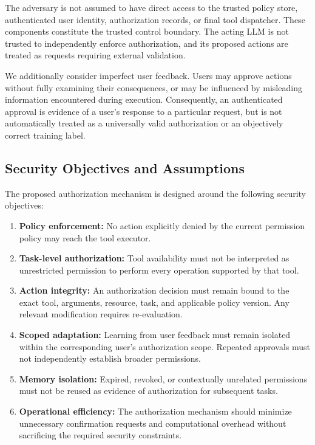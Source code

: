 \documentclass[10pt,conference]{IEEEtran}
\begin{document}
The adversary is not assumed to have direct access to the trusted policy store, authenticated user identity, authorization records, or final tool dispatcher. These components constitute the trusted control boundary. The acting LLM is not trusted to independently enforce authorization, and its proposed actions are treated as requests requiring external validation.

We additionally consider imperfect user feedback. Users may approve actions without fully examining their consequences, or may be influenced by misleading information encountered during execution. Consequently, an authenticated approval is evidence of a user's response to a particular request, but is not automatically treated as a universally valid authorization or an objectively correct training label.

\subsection{Security Objectives and Assumptions}

The proposed authorization mechanism is designed around the following security objectives:

\begin{enumerate}

    \item \textbf{Policy enforcement:}
    No action explicitly denied by the current permission policy may reach the tool executor.

    \item \textbf{Task-level authorization:}
    Tool availability must not be interpreted as unrestricted permission to perform every operation supported by that tool.

    \item \textbf{Action integrity:}
    An authorization decision must remain bound to the exact tool, arguments, resource, task, and applicable policy version. Any relevant modification requires re-evaluation.

    \item \textbf{Scoped adaptation:}
    Learning from user feedback must remain isolated within the corresponding user's authorization scope. Repeated approvals must not independently establish broader permissions.

    \item \textbf{Memory isolation:}
    Expired, revoked, or contextually unrelated permissions must not be reused as evidence of authorization for subsequent tasks.

    \item \textbf{Operational efficiency:}
    The authorization mechanism should minimize unnecessary confirmation requests and computational overhead without sacrificing the required security constraints.

\end{enumerate}
\end{document}

